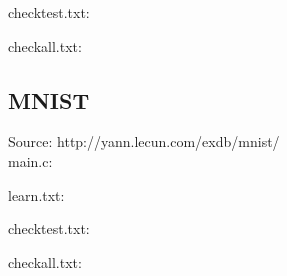 checktest.txt:\\
\begin{scriptsize}
\begin{ttfamily}

\end{ttfamily}
\end{scriptsize}

checkall.txt:\\
\begin{scriptsize}
\begin{ttfamily}

\end{ttfamily}
\end{scriptsize}

\subsection{MNIST}

Source: http://yann.lecun.com/exdb/mnist/ \\

main.c:\\
\begin{scriptsize}
\begin{ttfamily}

\end{ttfamily}
\end{scriptsize}

learn.txt:\\
\begin{scriptsize}
\begin{ttfamily}

\end{ttfamily}
\end{scriptsize}

checktest.txt:\\
\begin{scriptsize}
\begin{ttfamily}

\end{ttfamily}
\end{scriptsize}

checkall.txt:\\
\begin{scriptsize}
\begin{ttfamily}

\end{ttfamily}
\end{scriptsize}

